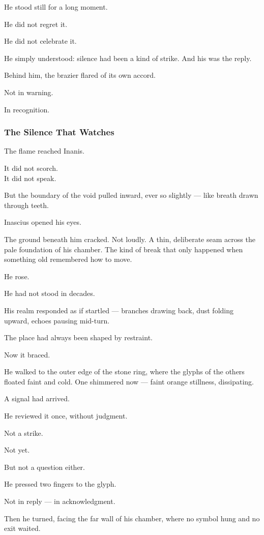 \documentclass[12pt]{article}
\begin{document}
He stood still for a long moment.

He did not regret it.

He did not celebrate it.

He simply understood: silence had been a kind of strike. And his was the reply.

Behind him, the brazier flared of its own accord.

Not in warning.

In recognition.

\dotfill

\subsubsection*{The Silence That Watches}

The flame reached Inanis.

It did not scorch.\\
It did not speak.

But the boundary of the void pulled inward, ever so slightly — like breath drawn through teeth.

Inascius opened his eyes.

The ground beneath him cracked. Not loudly. A thin, deliberate seam across the pale foundation of his chamber. The kind of break that only happened when something old remembered how to move.

He rose.

He had not stood in decades.

His realm responded as if startled — branches drawing back, dust folding upward, echoes pausing mid-turn.

The place had always been shaped by restraint.

Now it braced.

He walked to the outer edge of the stone ring, where the glyphs of the others floated faint and cold. One shimmered now — faint orange stillness, dissipating.

A signal had arrived.

He reviewed it once, without judgment.

Not a strike.

Not yet.

But not a question either.

He pressed two fingers to the glyph.

Not in reply — in acknowledgment.

Then he turned, facing the far wall of his chamber, where no symbol hung and no exit waited.
\end{document}
